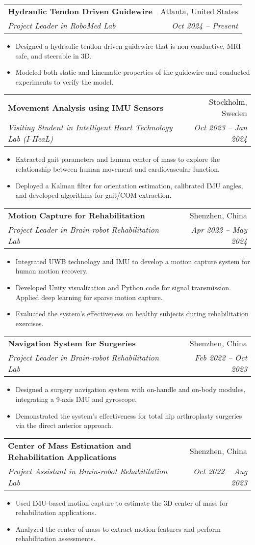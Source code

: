 \documentclass[letterpaper,11pt]{article}
\makeatletter
\newcommand{\resumeItem}[1]{
  \item\small{
    {#1 \vspace{-2pt}}
  }
}
\newcommand{\resumeSubheading}[4]{
  \vspace{-2pt}\item
  \begin{tabular*}{0.97\textwidth}[t]{l@{\extracolsep{\fill}}r}
    \textbf{#1} & #2 \\
    \textit{\small#3} & \textit{\small #4} \\
  \end{tabular*}\vspace{-7pt}
}
\newcommand{\resumeItemListStart}{\begin{itemize}}
\newcommand{\resumeItemListEnd}{\end{itemize}\vspace{-5pt}}
\makeatother
\begin{document}
\resumeSubheading
{Hydraulic Tendon Driven Guidewire}{Atlanta, United States}
{Project Leader in RoboMed Lab}{Oct 2024 -- Present}
\resumeItemListStart
  \resumeItem{Designed a hydraulic tendon-driven guidewire that is non-conductive, MRI safe, and steerable in 3D.}
  \resumeItem{Modeled both static and kinematic properties of the guidewire and conducted experiments to verify the model.}
\resumeItemListEnd

\resumeSubheading
{Movement Analysis using IMU Sensors}{Stockholm, Sweden}
{Visiting Student in Intelligent Heart Technology Lab (I-HeaL)}{Oct 2023 -- Jan 2024}
\resumeItemListStart
  \resumeItem{Extracted gait parameters and human center of mass to explore the relationship between human movement and cardiovascular function.}
  \resumeItem{Deployed a Kalman filter for orientation estimation, calibrated IMU angles, and developed algorithms for gait/COM extraction.}
\resumeItemListEnd

\resumeSubheading
{Motion Capture for Rehabilitation}{Shenzhen, China}
{Project Leader in Brain-robot Rehabilitation Lab}{Apr 2022 -- May 2024}
\resumeItemListStart
  \resumeItem{Integrated UWB technology and IMU to develop a motion capture system for human motion recovery.}
  \resumeItem{Developed Unity visualization and Python code for signal transmission. Applied deep learning for sparse motion capture.}
  \resumeItem{Evaluated the system’s effectiveness on healthy subjects during rehabilitation exercises.}
\resumeItemListEnd

\resumeSubheading
{Navigation System for Surgeries}{Shenzhen, China}
{Project Leader in Brain-robot Rehabilitation Lab}{Feb 2022 -- Oct 2023}
\resumeItemListStart
  \resumeItem{Designed a surgery navigation system with on-handle and on-body modules, integrating a 9-axis IMU and gyroscope.}
  \resumeItem{Demonstrated the system’s effectiveness for total hip arthroplasty surgeries via the direct anterior approach.}
\resumeItemListEnd

\resumeSubheading
{Center of Mass Estimation and Rehabilitation Applications}{Shenzhen, China}
{Project Assistant in Brain-robot Rehabilitation Lab}{Oct 2022 -- Aug 2023}
\resumeItemListStart
  \resumeItem{Used IMU-based motion capture to estimate the 3D center of mass for rehabilitation applications.}
  \resumeItem{Analyzed the center of mass to extract motion features and perform rehabilitation assessments.}
\resumeItemListEnd
\end{document}

